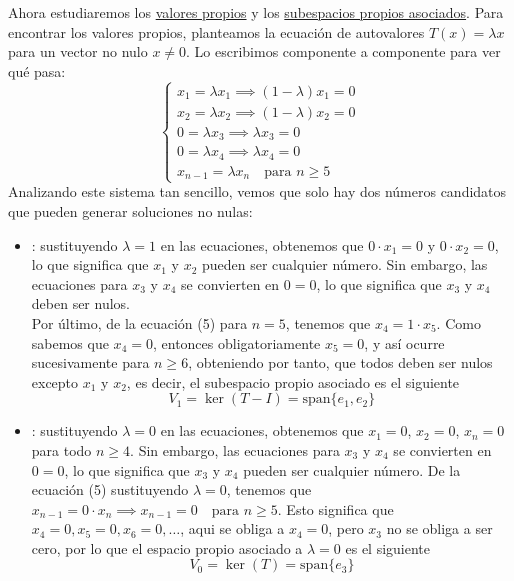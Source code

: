 \begin{ejercicio}
    \noindent
    Ahora estudiaremos los \underline{valores propios} y los \underline{subespacios propios asociados}. Para encontrar los valores propios, planteamos la ecuación de autovalores $T(x) = \lambda x$ para un vector no nulo $x \neq 0$. Lo escribimos componente a componente para ver qué pasa:
    \begin{equation*}
        \begin{cases}
            x_1 = \lambda x_1 \implies (1 - \lambda)x_1 = 0 \\
            x_2 = \lambda x_2 \implies (1 - \lambda)x_2 = 0 \\
            0 = \lambda x_3 \implies \lambda x_3 = 0 \\
            0 = \lambda x_4 \implies \lambda x_4 = 0 \\
            x_{n-1} = \lambda x_n \quad \text{para } n \geq 5
        \end{cases}
    \end{equation*}
    Analizando este sistema tan sencillo, vemos que solo hay dos números candidatos que pueden generar soluciones no nulas:
    \begin{itemize}
        \item {}: sustituyendo $\lambda=1$ en las ecuaciones, obtenemos que $0 \cdot x_1 = 0$ y $0 \cdot x_2 = 0$, lo que significa que $x_1$ y $x_2$ pueden ser cualquier número. Sin embargo, las ecuaciones para $x_3$ y $x_4$ se convierten en $0 = 0$, lo que significa que $x_3$ y $x_4$ deben ser nulos.  \\
        \noindent
        Por último, de la ecuación (5) para $n=5$, tenemos que $x_4 = 1 \cdot x_5$. Como sabemos que $x_4 = 0$, entonces obligatoriamente $x_5 = 0$, y así ocurre sucesivamente para $n\geq 6$, obteniendo por tanto, que todos deben ser nulos excepto $x_1$ y $x_2$, es decir, el subespacio propio asociado es el siguiente
        $$V_1 = \ker(T - I) = \text{span}\{e_1, e_2\}$$

        \item {}: sustituyendo $\lambda=0$ en las ecuaciones, obtenemos que $x_1 = 0$, $x_2 = 0$, $x_n = 0$ para todo $n \geq 4$. Sin embargo, las ecuaciones para $x_3$ y $x_4$ se convierten en $0 = 0$, lo que significa que $x_3$ y $x_4$ pueden ser cualquier número. De la ecuación (5) sustituyendo $\lambda = 0$, tenemos que $x_{n-1} = 0 \cdot x_n \implies x_{n-1} = 0 \quad \text{para } n \geq 5$. Esto significa que $x_4 = 0, x_5 = 0, x_6 = 0, \dots$, aqui se obliga a $x_4=0$, pero $x_3$ no se obliga a ser cero, por lo que el espacio propio asociado a $\lambda = 0$ es el siguiente
        $$V_0 = \ker(T) = \text{span}\{e_3\}$$


\end{itemize}
\end{ejercicio}
